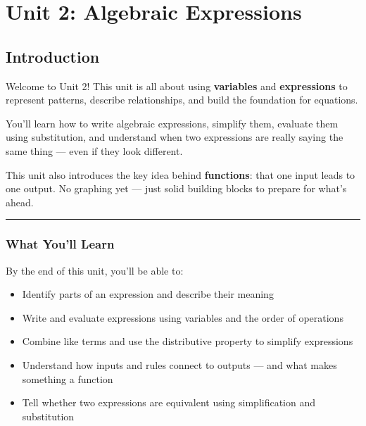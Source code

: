 \documentclass[
  letterpaper,
  DIV=11,
  numbers=noendperiod]{scrreprt}
\providecommand{\tightlist}{%
  \setlength{\itemsep}{0pt}\setlength{\parskip}{0pt}}
\begin{document}
\part{Unit 2: Algebraic Expressions}

\chapter*{Introduction}\label{introduction-1}


Welcome to Unit 2! This unit is all about using \textbf{variables} and
\textbf{expressions} to represent patterns, describe relationships, and
build the foundation for equations.

You'll learn how to write algebraic expressions, simplify them, evaluate
them using substitution, and understand when two expressions are really
saying the same thing --- even if they look different.

This unit also introduces the key idea behind \textbf{functions}: that
one input leads to one output. No graphing yet --- just solid building
blocks to prepare for what's ahead.

\begin{center}\rule{0.5\linewidth}{0.5pt}\end{center}

\section*{What You'll Learn}\label{what-youll-learn-1}


By the end of this unit, you'll be able to:

\begin{itemize}
\tightlist
\item
  Identify parts of an expression and describe their meaning\\
\item
  Write and evaluate expressions using variables and the order of
  operations\\
\item
  Combine like terms and use the distributive property to simplify
  expressions\\
\item
  Understand how inputs and rules connect to outputs --- and what makes
  something a function\\
\item
  Tell whether two expressions are equivalent using simplification and
  substitution
\end{itemize}
\end{document}
